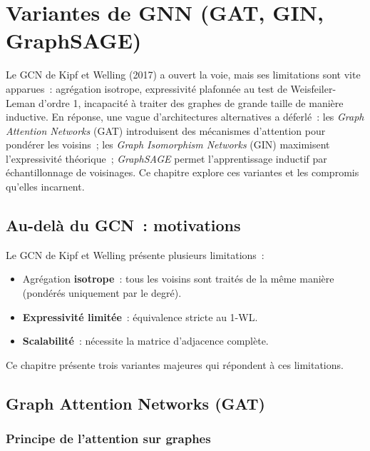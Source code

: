 \chapter{Variantes de GNN (GAT, GIN, GraphSAGE)}
\label{ch:variantes}

Le GCN de Kipf et Welling (2017) a ouvert la voie, mais ses limitations sont vite apparues~: agr\'egation isotrope, expressivit\'e plafonn\'ee au test de Weisfeiler-Leman d'ordre 1, incapacit\'e \`a traiter des graphes de grande taille de mani\`ere inductive. En r\'eponse, une vague d'architectures alternatives a d\'eferl\'e~: les \emph{Graph Attention Networks} (GAT) introduisent des m\'ecanismes d'attention pour pond\'erer les voisins~; les \emph{Graph Isomorphism Networks} (GIN) maximisent l'expressivit\'e th\'eorique~; \emph{GraphSAGE} permet l'apprentissage inductif par \'echantillonnage de voisinages. Ce chapitre explore ces variantes et les compromis qu'elles incarnent.

\section{Au-del\`a du GCN~: motivations}

Le GCN de Kipf et Welling pr\'esente plusieurs limitations~:
\begin{itemize}
    \item Agr\'egation \textbf{isotrope}~: tous les voisins sont trait\'es de la m\^eme
          mani\`ere (pond\'er\'es uniquement par le degr\'e).
    \item \textbf{Expressivit\'e limit\'ee}~: \'equivalence stricte au 1-WL.
    \item \textbf{Scalabilit\'e}~: n\'ecessite la matrice d'adjacence compl\`ete.
\end{itemize}

Ce chapitre pr\'esente trois variantes majeures qui r\'epondent \`a ces limitations.

\section{Graph Attention Networks (GAT)}

\subsection{Principe de l'attention sur graphes}

